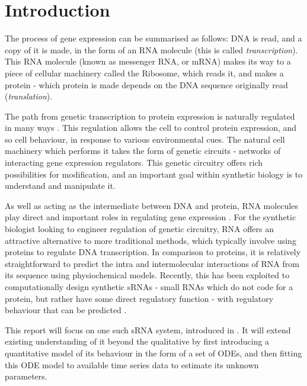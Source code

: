 \documentclass[10pt,journal]{./IEEE_latex_class/IEEEtran}
\begin{document}
\IEEEpeerreviewmaketitle




\section{Introduction}
\label{sec: Intro}
The process of gene expression can be summarised as follows: DNA is read, and a copy of it is made, in the form of an RNA molecule (this is called \textit{transcription}). This RNA molecule (known as messenger RNA, or mRNA) makes its way to a piece of cellular machinery called the Ribosome, which reads it, and makes a protein - which protein is made depends on the DNA sequence originally read (\textit{translation}).  

 The path from genetic transcription to protein expression is naturally regulated in many ways \cite{MolecularBiology}. This regulation allows the cell to control protein expression, and so cell behaviour, in response to various environmental cues. The natural cell machinery which performs it takes the form of genetic circuits - networks of interacting gene expression regulators. This genetic circuitry offers rich possibilities for modification, and an important goal within synthetic biology is to understand and manipulate it.

As well as acting as the intermediate between DNA and protein, RNA molecules play direct and important roles in regulating gene expression \cite{Isaacs2006}. For the synthetic biologist looking to engineer regulation of genetic circuitry, RNA offers an attractive alternative to more traditional methods, which typically involve using proteins to regulate DNA transcription. In comparison to proteins, it is relatively straightforward to predict the intra and intermolecular interactions of RNA from its sequence using physiochemical models. Recently, this has been exploited to computationally design synthetic sRNAs - small RNAs which do not code for a protein, but rather have some direct regulatory function -  with regulatory behaviour that can be predicted \cite{Rodrigo2013}\cite{Rodrigo2012}.

This report will focus on one such sRNA system, introduced in \cite{Rodrigo2012}. It will extend existing understanding of it beyond the qualitative by first introducing a quantitative model of its behaviour in the form of a set of ODEs, and then fitting this ODE model to available time series data to estimate its unknown parameters.
\end{document}
